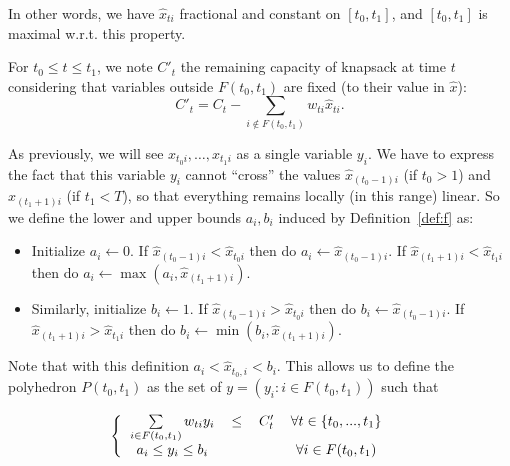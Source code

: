 \documentclass[a4paper]{book}
\begin{document}
In other words, we have $\hat{x}_{ti}$ fractional and constant on $[t_0,t_1]$, and $[t_0,t_1]$ is maximal w.r.t. this property. 

For $t_0\leq t\leq t_1$, we note $C'_t$ the remaining capacity of knapsack at time $t$ considering that variables outside $F(t_0,t_1)$ are fixed (to their value in $\hat{x}$):
$$C'_t=C_t-\sum_{i\not\in F(t_0,t_1)}w_{ti}\hat{x}_{ti}.$$

As previously, we will see $x_{t_0i},\dots,x_{t_1i}$ as a single variable $y_i$. We have to express the fact that this variable $y_i$ cannot ``cross'' the values $\hat{x}_{(t_0-1)i}$ (if $t_0>1$) and $\hat{x}_{(t_1+1)i}$ (if $t_1<T$), so that everything remains locally (in this range) linear. So we define the lower and upper bounds $a_i,b_i$ induced by Definition~\ref{def:f} as:
\begin{itemize}
	\item Initialize $a_i\leftarrow 0$. If $\hat{x}_{(t_0-1)i}< \hat{x}_{t_0i}$ then do $a_i\leftarrow \hat{x}_{(t_0-1)i}$. If $\hat{x}_{(t_1+1)i}< \hat{x}_{t_1i}$ then do $a_i\leftarrow \max(a_i,\hat{x}_{(t_1+1)i})$.
	\item Similarly, initialize $b_i\leftarrow 1$. If $\hat{x}_{(t_0-1)i}> \hat{x}_{t_0i}$ then do $b_i\leftarrow \hat{x}_{(t_0-1)i}$. If $\hat{x}_{(t_1+1)i}> \hat{x}_{t_1i}$ then do $b_i\leftarrow \min(b_i,\hat{x}_{(t_1+1)i})$.
\end{itemize}

Note that with this definition $a_i<\hat{x}_{t_0,i}<b_i$.
This allows us to define the polyhedron $P(t_0,t_1)$ as the set of $y=(y_i:i\in F(t_0,t_1))$ such that

\[  \left \{ 
\begin{tabular}{ccccc}
$\sum\limits_{i \in F(t_0,t_1)} w_{ti} y_{i}$ &$\leq$ & $C'_t$&$\forall{t} \in \{t_0,...,t_1\}$  \\
$a_i\leq y_{i} \leq b_i$&&&$\forall{i} \in F(t_0,t_1)$ & \\
\end{tabular} 
\right.
\]
\end{document}
